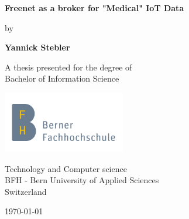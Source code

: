 \documentclass[12pt,oneside]{report}
\begin{document}
\renewcommand{\figurename}{Fig.}
\pagestyle{empty}
\begin{titlepage}
    \begin{center}
        \vspace*{1cm}
            
        \Huge
        \textbf{Freenet as a broker for "Medical" IoT Data}
            
        \vspace{1cm}
        \LARGE
        by
            
        \vspace{1cm}
            
        \textbf{Yannick Stebler}
            
        \vfill
            
        A thesis presented for the degree of\\
        Bachelor of Information Science
            
        \vspace{0.8cm}
            
        \includegraphics[width=0.4\textwidth]{BFHLOGO}
            
        \Large
        Technology and Computer science\\
        BFH - Bern University of Applied Sciences\\
        Switzerland\\
        {\large \today\par}
            
    \end{center}
\end{titlepage}
\newpage

\end{document}
